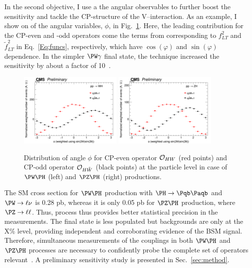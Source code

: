 \documentclass[a4paper,11pt]{article}
\newcommand{\Pb}{{{\Pqb}}\xspace}
\newcommand{\PAb}{{{{\Paqb}}}\xspace}
\renewcommand{\PV}{{{{V}}}\xspace}
\begin{document}
In the second objective, I use a the angular observables to further boost the sensitivity and tackle the CP-structure of the \PV--\PH interaction. 
As an example, I show on of the angular variables, $\phi$, in Fig.~\ref{fig:LHE_phi}. 
Here, the leading contribution for the CP-even and -odd operators come the terms from corresponding to $f^{2}_{LT}$ and $\tilde{f}^2_{LT}$ in Eq.~\eqref{Eq:funcs}, respectively, which have $\cos\left(\varphi\right)$ and $\sin\left(\varphi\right)$ dependence.
In the simpler $\PW\gamma$ final state, the technique increased the sensitivity by about a factor of 10~\cite{CMS-PAS-SMP-20-005}.
\begin{figure}[hbtp]
\begin{center}
\includegraphics[width=0.45\textwidth]{Figures/LHE/WH/LHE_Plot_phi.png}
\includegraphics[width=0.45\textwidth]{Figures/LHE/ZH/LHE_Plot_phi.png}
\end{center}
\caption{
Distribution of angle $\phi$ for CP-even operator ${\cal O}_{HW}$  (red points) and CP-odd operator ${\cal O}_{H\tilde{W}}$ (black points) at the particle level in case of $\PW\PH$ (left) and $\PZ\PH$ (right) productions.
}
\label{fig:LHE_phi}
\end{figure}

The SM cross section for $\PW\PH$ production with  $\PH\rightarrow\Pb\PAb$ and $\PW\rightarrow\ell\nu$  is 0.28 pb, whereas it is only 0.05 pb for $\PZ\PH$ production, where $\PZ\rightarrow\ell\ell$.
Thus, \PW process thus provides better statistical precision in the measurements. 
The \PZ final state is less populated but backgrounds are only at the X\% level, providing independent and corroborating evidence of the BSM signal. 
Therefore, simultaneous measurements of the couplings in both $\PW\PH$ and $\PZ\PH$ processes are necessary to confidently probe the complete set of operators relevant~\cite{Banerjee:2019twi}.
A preliminary sensitivity study is presented in Sec.~\ref{sec:method}. 
\end{document}
